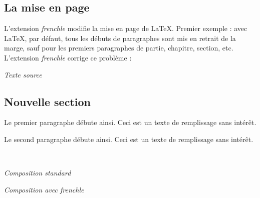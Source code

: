 \documentclass[a4paper,12pt,openright]{article}
\begin{document}
\subsection{La mise en page}
L’extension \textit{frenchle} modifie la mise en page de \LaTeX. Premier exemple :
avec \LaTeX, par défaut, tous les débuts de paragraphes sont mis en retrait de
la marge, sauf pour les premiers paragraphes de partie, chapitre, section, etc.
L’extension \textit{frenchle} corrige ce problème :\\[1em]
\begin{center} %
\begin{minipage}{\textwidth}
\begin{center}
\textit{Texte source}\\
\begin{boxedverbatim}
\section{Nouvelle section}
Le premier paragraphe débute ainsi.
Ceci est un texte de remplissage sans
intérêt.

Le second paragraphe débute ainsi.
Ceci est un texte de remplissage sans
intérêt.
\end{boxedverbatim}
\\[.5em]
\end{center}
\end{minipage}
\setcounter{mpfootnote}{1} %
\renewcommand{\thempfootnote}{\arabic{mpfootnote}}
\noindent
\parbox{70mm}{
\begin{center} \nofrenchtypography
\textit{Composition standard} \small 
\end{center}
}%
\parbox{70mm}{
\begin{center} \frenchtypography \frenchlayout
\textit{Composition avec frenchle} \small 
\end{center}
}\\[1.5em]
%
\end{center} %
\end{document}
